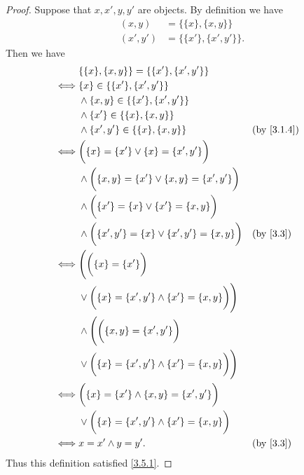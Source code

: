 \begin{proof}
  Suppose that \(x, x', y, y'\) are objects.
  By definition we have
  \begin{align*}
    (x, y)   & = \{\{x\}, \{x, y\}\}     \\
    (x', y') & = \{\{x'\}, \{x', y'\}\}.
  \end{align*}
  Then we have
  \begin{align*}
         & \{\{x\}, \{x, y\}\} = \{\{x'\}, \{x', y'\}\}                                                  \\
    \iff & \{x\} \in \{\{x'\}, \{x', y'\}\}                                                              \\
         & \land \{x, y\} \in \{\{x'\}, \{x', y'\}\}                                                     \\
         & \land \{x'\} \in \{\{x\}, \{x, y\}\}                                                          \\
         & \land \{x', y'\} \in \{\{x\}, \{x, y\}\}                          &  & \by{3.1.4}             \\
    \iff & \bigg(\{x\} = \{x'\} \lor \{x\} = \{x', y'\}\bigg)                                            \\
         & \land \bigg(\{x, y\} = \{x'\} \lor \{x, y\} = \{x', y'\}\bigg)                                \\
         & \land \bigg(\{x'\} = \{x\} \lor \{x'\} = \{x, y\}\bigg)                                       \\
         & \land \bigg(\{x', y'\} = \{x\} \lor \{x', y'\} = \{x, y\}\bigg)   &  & \text{(by \cref{3.3})} \\
    \iff & \Bigg(\bigg(\{x\} = \{x'\}\bigg)                                                              \\
         & \lor \bigg(\{x\} = \{x', y'\} \land \{x'\} = \{x, y\}\bigg)\Bigg)                             \\
         & \land \Bigg(\bigg(\{x, y\} = \{x', y'\}\bigg)                                                 \\
         & \lor \bigg(\{x\} = \{x', y'\} \land \{x'\} = \{x, y\}\bigg)\Bigg)                             \\
    \iff & \bigg(\{x\} = \{x'\} \land \{x, y\} = \{x', y'\}\bigg)                                        \\
         & \lor \bigg(\{x\} = \{x', y'\} \land \{x'\} = \{x, y\}\bigg)                                   \\
    \iff & x = x' \land y = y'.                                              &  & \text{(by \cref{3.3})}
  \end{align*}
  Thus this definition satisfied \cref{3.5.1}.


\end{proof}
